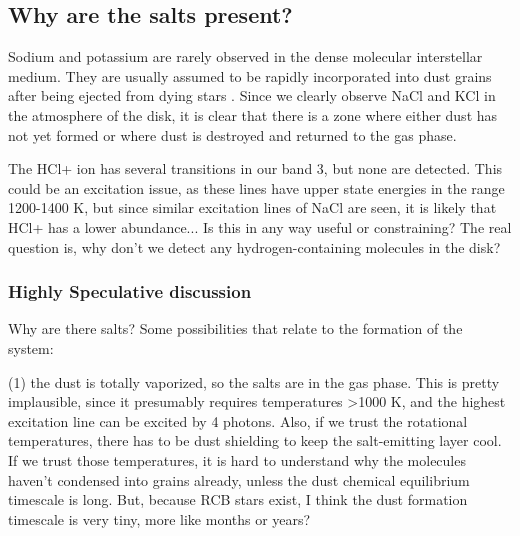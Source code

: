 \documentclass[twocolumn]{aastex62}
\begin{document}
\subsection{Why are the salts present?}

Sodium and potassium are rarely observed in the dense molecular interstellar
medium.  They are usually assumed to be rapidly incorporated into dust grains
after being ejected from dying stars \citep[e.g.][]{Milam2007a}.  Since we
clearly observe NaCl and KCl in the atmosphere of the disk, it is clear that
there is a zone where either dust has not yet formed or
where dust is destroyed and returned to the gas phase.



The HCl+ ion has several transitions in our band 3, but none are detected.
This could be an excitation issue, as these lines have upper state energies
in the range 1200-1400 K, but since similar excitation lines of NaCl are
seen, it is likely that HCl+ has a lower abundance...
Is this in any way useful or constraining?
The real question is, why don't we detect any hydrogen-containing molecules
in the disk?



\subsubsection{Highly Speculative discussion}
Why are there salts?  Some possibilities that relate to the formation of the system:

(1) the dust is totally vaporized, so the salts are in the gas phase.  This is
pretty implausible, since it presumably requires temperatures >1000 K,
and the highest excitation line can be excited by 4 \um photons.
Also, if we trust the rotational temperatures, there has to be dust
shielding to keep the salt-emitting layer cool.  If we trust those temperatures,
it is hard to understand why the molecules haven't condensed into grains
already, unless the dust chemical equilibrium timescale is long.  But, because
RCB stars exist, I think the dust formation timescale is very tiny, more like
months or years?
\end{document}
